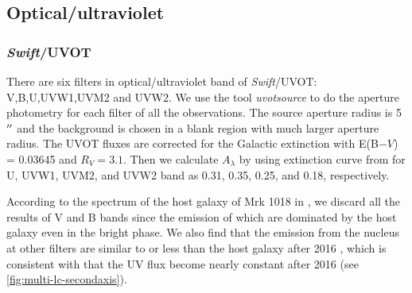 \documentclass[twocolumn]{aastex63}
\newcommand{\swift}{{\em Swift}}
\begin{document}
\subsection{Optical/ultraviolet}
\subsubsection{\swift/UVOT}
There are six filters in optical/ultraviolet band of \swift/UVOT: V,B,U,UVW1,UVM2 and UVW2. We use the tool \textit{uvotsource} to do the aperture photometry for each filter of all the observations. The source aperture radius is 5$\mbox{$^{\prime\prime}$}$ and the background is chosen in a blank region with much larger aperture radius. The UVOT fluxes are corrected for the Galactic extinction with \texorpdfstring{E(B$-V$) = 0.03645} \citet{2018MNRAS.480.3898N} and $R_{V}=3.1$. Then we calculate  $A_{\lambda}$ by using extinction curve from \citet{2007ApJ...663..320F} for U, UVW1, UVM2, and 
UVW2 band as 0.31, 0.35, 0.25, and 0.18, respectively. 

According to the spectrum of the host galaxy of Mrk 1018 in \citep{2018MNRAS.480.3898N}, we discard all the results of V and B bands since the emission of which are dominated by the host galaxy even in the bright phase. We also find that the emission from the nucleus at other filters are similar to or less than the host galaxy after 2016 \citep{2018MNRAS.480.3898N}, which is consistent with that the UV flux become nearly constant after 2016 (see \autoref{fig:multi-lc-secondaxis}). 






\end{document}
